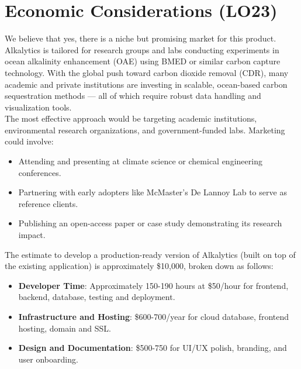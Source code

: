 \documentclass{article}
\begin{document}
\section{Economic Considerations (LO23)}


We believe that yes, there is a niche but promising market for this product. Alkalytics is 
tailored for research groups and labs conducting experiments in ocean alkalinity enhancement 
(OAE) using BMED or similar carbon capture technology. With the global push toward carbon 
dioxide removal (CDR), many academic and private institutions are investing in scalable, 
ocean-based carbon sequestration methods — all of which require robust data handling and 
visualization tools. \\

The most effective approach would be targeting academic institutions, environmental research 
organizations, and government-funded labs. Marketing could involve:
\begin{itemize}
    \item Attending and presenting at climate science or chemical engineering conferences.
    \item Partnering with early adopters like McMaster’s De Lannoy Lab to serve as reference clients.
    \item Publishing an open-access paper or case study demonstrating its research impact.
\end{itemize}

The estimate to develop a production-ready version of Alkalytics (built on top of the existing application) 
is approximately \$10,000, broken down as follows:
\begin{itemize}
    \item \textbf{Developer Time}: Approximately 150-190 hours at \$50/hour for frontend, backend, 
    database, testing and deployment.
    \item \textbf{Infrastructure and Hosting}: \$600-700/year for cloud database, frontend hosting, domain and SSL.
    \item \textbf{Design and Documentation}: \$500-750 for UI/UX polish, branding, and user onboarding.
\end{itemize}
\end{document}

